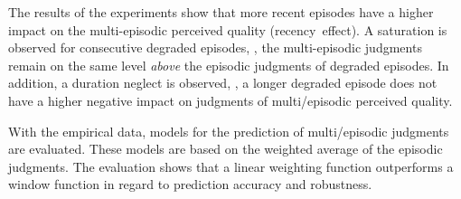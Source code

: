 The results of the experiments show that more recent episodes have a higher impact on the multi-episodic perceived quality (recency~effect). 
A saturation is observed for consecutive degraded episodes, \ie, the multi-episodic judgments remain on the same level \emph{above} the episodic judgments of degraded episodes.
In addition, a duration neglect is observed, \ie, a longer degraded episode does not have a higher negative impact on judgments of multi\-/episodic perceived quality. 


With the empirical data, models for the prediction of multi\-/episodic judgments are evaluated.
These models are based on the weighted average of the episodic judgments.
The evaluation shows that a linear weighting function outperforms a window function in regard to prediction accuracy and robustness.



